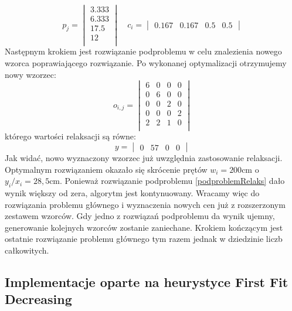 \[
    p_j = 
    \begin{vmatrix}
        3.333 \\
        6.333 \\
        17.5 \\
        12 \\
    \end{vmatrix}
    \quad
    c_i = 
    \begin{vmatrix}
        0.167 & 0.167 & 0.5 & 0.5
    \end{vmatrix}
\]
Następnym krokiem jest rozwiązanie podproblemu w celu znalezienia nowego wzorca poprawiającego rozwiązanie. Po wykonanej optymalizacji otrzymujemy nowy wzorzec:
\[
    o_{i,j} = 
    \begin{vmatrix}
        6 & 0 & 0 & 0 \\
        0 & 6 & 0 & 0 \\
        0 & 0 & 2 & 0 \\
        0 & 0 & 0 & 2 \\
        2 & 2 & 1 & 0 \\
    \end{vmatrix}
\]
którego wartości relaksacji są równe:
\[
    y =     
    \begin{vmatrix}
        0 & 57 & 0 & 0
    \end{vmatrix}
\]
Jak widać, nowo wyznaczony wzorzec już uwzględnia zastosowanie relaksacji. Optymalnym rozwiązaniem okazało się skrócenie prętów \(w_i = 200\text{cm}\) o \(y_i/x_i=28{,}5 \text{cm}\). Ponieważ rozwiązanie podproblemu \ref{podproblemRelaks} dało wynik większy od zera, algorytm jest kontynuowany. Wracamy więc do rozwiązania problemu głównego i wyznaczenia nowych cen już z rozszerzonym zestawem wzorców. Gdy jedno z rozwiązań podproblemu da wynik ujemny, generowanie kolejnych wzorców zostanie zaniechane. Krokiem kończącym jest ostatnie rozwiązanie problemu głównego tym razem jednak w dziedzinie liczb całkowitych.

\subsection{Implementacje oparte na heurystyce First Fit Decreasing}

